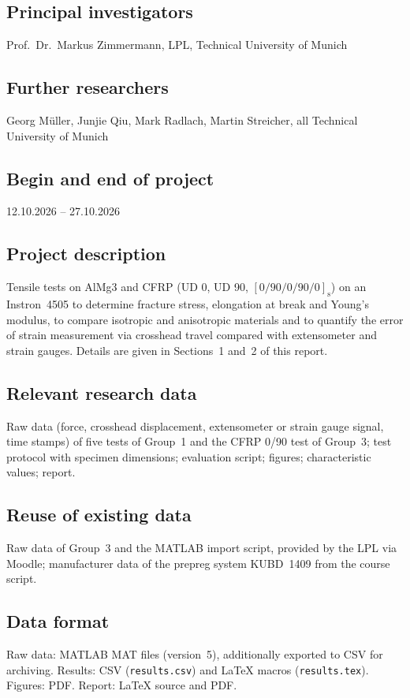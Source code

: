 \documentclass[11pt,a4paper]{article}
\begin{document}
\subsection*{Principal investigators}
Prof.~Dr.~Markus Zimmermann, LPL, Technical University of Munich

\subsection*{Further researchers}
Georg Müller, Junjie Qiu, Mark Radlach, Martin Streicher, all Technical
University of Munich

\subsection*{Begin and end of project}
12.10.2026 -- 27.10.2026

\subsection*{Project description}
Tensile tests on AlMg3 and CFRP (UD 0\textdegree, UD 90\textdegree,
$[0/90/0/90/0]_\mathrm{s}$) on an Instron~4505 to determine fracture stress,
elongation at break and Young's modulus, to compare isotropic and
anisotropic materials and to quantify the error of strain measurement via
crosshead travel compared with extensometer and strain gauges. Details are
given in Sections~1 and~2 of this report.

\subsection*{Relevant research data}
Raw data (force, crosshead displacement, extensometer or strain gauge
signal, time stamps) of five tests of Group~1 and the CFRP
0\textdegree/90\textdegree{} test of Group~3; test protocol with specimen
dimensions; evaluation script; figures; characteristic values; report.

\subsection*{Reuse of existing data}
Raw data of Group~3 and the MATLAB import script, provided by the LPL via
Moodle; manufacturer data of the prepreg system KUBD~1409 from the course
script.

\subsection*{Data format}
Raw data: MATLAB MAT files (version~5), additionally exported to CSV for
archiving. Results: CSV (\texttt{results.csv}) and \LaTeX{} macros (\texttt{results.tex}). Figures: PDF. Report:
\LaTeX{} source and PDF.
\end{document}
